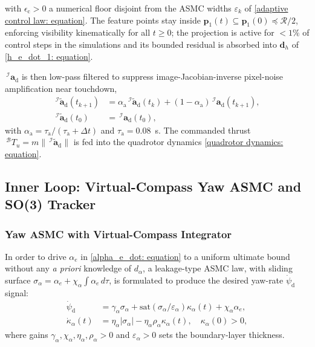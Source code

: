 with $\epsilon_\text{c}>0$ a numerical floor disjoint from the ASMC widths $\varepsilon_k$ of \eqref{adaptive control law: equation}. The feature points stay inside $\boldsymbol{p}_1(t)\subseteq\boldsymbol{p}_1(0)\preceq\mathcal{R}/2$, enforcing visibility kinematically for all $t\ge 0$; the projection is active for $<1\%$ of control steps in the simulations and its bounded residual is absorbed into $\boldsymbol{d}_h$ of \eqref{h_e_dot_1: equation}.

$\,^\mathcal{I}\boldsymbol{a}_\text{d}$ is then low-pass filtered to suppress image-Jacobian-inverse pixel-noise amplification near touchdown,
\begin{align} \label{lpf: equation}
    \,^\mathcal{I}\!\tilde{\boldsymbol{a}}_\text{d}(t_{k+1}) &= \alpha_\text{a}\,^\mathcal{I}\!\tilde{\boldsymbol{a}}_\text{d}(t_k)+(1-\alpha_\text{a})\,^\mathcal{I}\!\boldsymbol{a}_\text{d}(t_{k+1}), \nonumber\\
    \,^\mathcal{I}\!\tilde{\boldsymbol{a}}_\text{d}(t_0) &= \,^\mathcal{I}\!\boldsymbol{a}_\text{d}(t_0),
\end{align}
with $\alpha_\text{a}=\tau_\text{a}/(\tau_\text{a}+\Delta t)$ and $\tau_\text{a}=0.08$~s. The commanded thrust $\,^\mathcal{B}T_u=m\|\,^\mathcal{I}\tilde{\boldsymbol{a}}_\text{d}\|$ is fed into the quadrotor dynamics \eqref{quadrotor dynamics: equation}.

\subsection{Inner Loop: Virtual-Compass Yaw ASMC and SO(3) Tracker} \label{inner loop: section}

\subsubsection{Yaw ASMC with Virtual-Compass Integrator}
In order to drive $\alpha_e$ in \eqref{alpha_e_dot: equation} to a uniform ultimate bound without any \emph{a priori} knowledge of $d_{\alpha}$, a leakage-type ASMC law, with sliding surface $\sigma_{\alpha}=\alpha_e+\chi_{\alpha}\!\int\alpha_e\,d\tau$, is formulated to produce the desired yaw-rate $\dot{\psi}_\text{d}$ signal:
\begin{align} \label{yaw control law: equation}
    \dot{\psi}_\text{d} &= \gamma_{\alpha}\sigma_{\alpha} + \text{sat}(\sigma_{\alpha}/\varepsilon_{\alpha})\kappa_{\alpha}(t) + \chi_{\alpha} \alpha_e, \nonumber\\
    \dot{\kappa}_{\alpha}(t) &= \eta_{\alpha}|\sigma_{\alpha}| - \eta_{\alpha}\rho_{\alpha}\kappa_{\alpha}(t),\quad\kappa_{\alpha}(0)>0,
\end{align}
where gains $\gamma_{\alpha}, \chi_{\alpha}, \eta_{\alpha}, \rho_{\alpha} > 0$ and $\varepsilon_{\alpha}>0$ sets the boundary-layer thickness.

